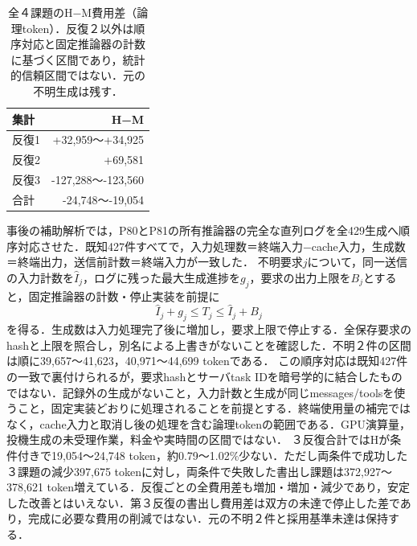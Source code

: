 \begin{table}[tb]
\centering\small\setlength{\tabcolsep}{4pt}
\caption{全４課題のH−M費用差（論理token）．反復２以外は順序対応と固定推論器の計数に基づく区間であり，統計的信頼区間ではない．元の不明生成は残す．}
\begin{tabular}{lr}
集計 & H−M \\ \hline
反復1 & +32,959〜+34,925 \\
反復2 & +69,581 \\
反復3 & -127,288〜-123,560 \\
合計 & -24,748〜-19,054 \\
\hline
\end{tabular}
\end{table}
事後の補助解析では，P80とP81の所有推論器の完全な直列ログを全429生成へ順序対応させた．既知427件すべてで，入力処理数＝終端入力−cache入力，生成数＝終端出力，送信前計数＝終端入力が一致した．
不明要求$j$について，同一送信の入力計数を$\widehat I_j$，ログに残った最大生成進捗を$g_j$，要求の出力上限を$B_j$とすると，固定推論器の計数・停止実装を前提に
\begin{equation}\widehat I_j+g_j\leq T_j\leq\widehat I_j+B_j\end{equation}
を得る．生成数は入力処理完了後に増加し，要求上限で停止する．全保存要求のhashと上限を照合し，別名による上書きがないことを確認した．不明２件の区間は順に39,657〜41,623，40,971〜44,699 tokenである．
この順序対応は既知427件の一致で裏付けられるが，要求hashとサーバtask IDを暗号学的に結合したものではない．記録外の生成がないこと，入力計数と生成が同じmessages/toolsを使うこと，固定実装どおりに処理されることを前提とする．終端使用量の補完ではなく，cache入力と取消し後の処理を含む論理tokenの範囲である．GPU演算量，投機生成の未受理作業，料金や実時間の区間ではない．
３反復合計ではHが条件付きで19,054〜24,748 token，約0.79〜1.02\%少ない．ただし両条件で成功した３課題の減少397,675 tokenに対し，両条件で失敗した書出し課題は372,927〜378,621 token増えている．反復ごとの全費用差も増加・増加・減少であり，安定した改善とはいえない．第３反復の書出し費用差は双方の未達で停止した差であり，完成に必要な費用の削減ではない．元の不明２件と採用基準未達は保持する．
